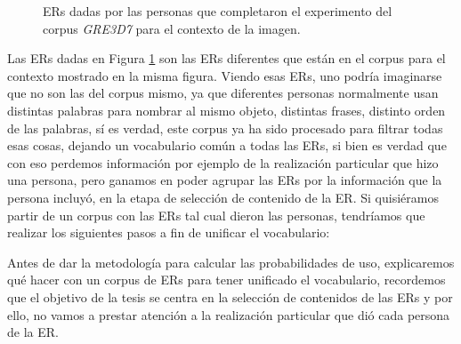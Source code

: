 \begin{figure}[h]
\begin{minipage}[b]{0.5\linewidth}
{%
}
\end{minipage}
\caption{ERs dadas por las personas que completaron el experimento del corpus \textit{GRE3D7} para el contexto de la imagen.}\label{fig4-4}
\end{figure}
Las ERs dadas en Figura \ref{fig4-4} son las ERs diferentes que est\'an en el corpus para el contexto mostrado en la misma figura. Viendo esas ERs, uno podr\'ia imaginarse que no son las del corpus mismo, ya que diferentes personas normalmente usan distintas palabras para nombrar al mismo objeto, distintas frases, distinto orden de las palabras, s\'i es verdad, este corpus ya ha sido procesado para filtrar todas esas cosas, dejando un vocabulario com\'un a todas las ERs, si bien es verdad que con eso perdemos informaci\'on por ejemplo de la realizaci\'on particular que hizo una persona, pero ganamos en poder agrupar las ERs por la informaci\'on que la persona incluy\'o, en la etapa de selecci\'on de contenido de la ER. Si quisi\'eramos partir de un corpus con las ERs tal cual dieron las personas, tendr\'iamos que realizar los siguientes pasos a fin de unificar el vocabulario:

Antes de dar la metodolog\'ia para calcular las probabilidades de uso, explicaremos qu\'e hacer con un corpus de ERs para tener unificado el vocabulario, recordemos que el objetivo de la tesis se centra en la selecci\'on de contenidos de las ERs y por ello, no vamos a prestar atenci\'on a la realizaci\'on particular que di\'o cada persona de la ER. 

